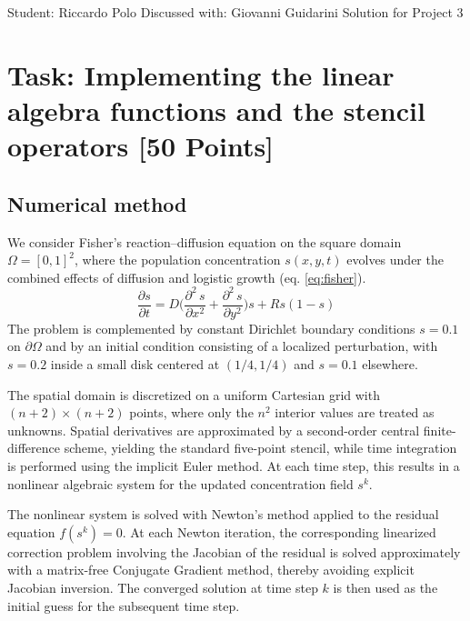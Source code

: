 \documentclass[unicode,10pt,a4paper,oneside,numbers=endperiod,openany]{scrartcl}
\begin{document}
\setassignment
{}

            {Student: Riccardo Polo}
            {Discussed with: Giovanni Guidarini}
            {Solution for Project 3}{}
\newline

\assignmentpolicy

\newpage
\section{Task: Implementing the linear algebra functions and the stencil
         operators [50 Points]}
\subsection{Numerical method }
We consider Fisher's reaction--diffusion equation on the square domain \(\Omega=[0,1]^2\), where the population concentration \(s(x,y,t)\) evolves under the combined effects of diffusion and logistic growth (eq. \ref{eq:fisher}).
\begin{equation}
\label{eq:fisher}
\frac{\partial s}{\partial t} = D \biggl(\frac{\partial^2\, s}{\partial x^2} + \frac{\partial^2\, s}{\partial y^2}\biggr) s + R s (1 - s)
\end{equation}
The problem is complemented by constant Dirichlet boundary conditions \(s=0.1\) on \(\partial\Omega\) and by an initial condition consisting of a localized perturbation, with \(s=0.2\) inside a small disk centered at \((1/4,1/4)\) and \(s=0.1\) elsewhere.

The spatial domain is discretized on a uniform Cartesian grid with \((n+2)\times(n+2)\) points, where only the \(n^2\) interior values are treated as unknowns. Spatial derivatives are approximated by a second-order central finite-difference scheme, yielding the standard five-point stencil, while time integration is performed using the implicit Euler method. At each time step, this results in a nonlinear algebraic system for the updated concentration field \(s^k\).

The nonlinear system is solved with Newton's method applied to the residual equation \(f(s^k)=0\). At each Newton iteration, the corresponding linearized correction problem involving the Jacobian of the residual is solved approximately with a matrix-free Conjugate Gradient method, thereby avoiding explicit Jacobian inversion. The converged solution at time step \(k\) is then used as the initial guess for the subsequent time step.\\
\end{document}
